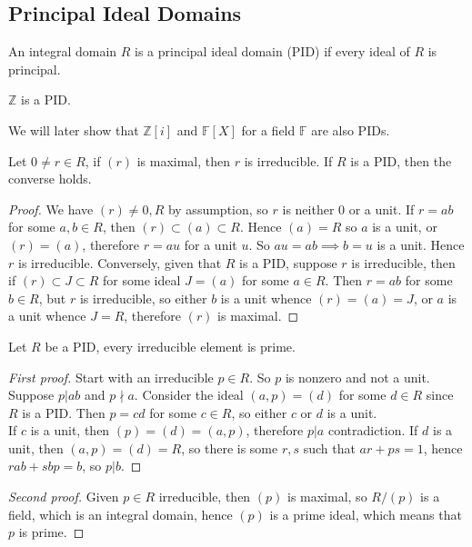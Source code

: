 \subsection{Principal Ideal Domains}
\begin{definition}
    An integral domain $R$ is a principal ideal domain (PID) if every ideal of $R$ is principal.
\end{definition}
\begin{example}
    $\mathbb Z$ is a PID.
\end{example}
We will later show that $\mathbb Z[i]$ and $\mathbb F[X]$ for a field $\mathbb F$ are also PIDs.
\begin{lemma}
    Let $0\neq r\in R$, if $(r)$ is maximal, then $r$ is irreducible.
    If $R$ is a PID, then the converse holds.
\end{lemma}
\begin{proof}
    We have $(r)\neq 0,R$ by assumption, so $r$ is neither $0$ or a unit.
    If $r=ab$ for some $a,b\in R$, then $(r)\subset (a)\subset R$.
    Hence $(a)=R$ so $a$ is a unit, or $(r)=(a)$, therefore $r=au$ for a unit $u$.
    So $au=ab\implies b=u$ is a unit.
    Hence $r$ is irreducible.
    Conversely, given that $R$ is a PID, suppose $r$ is irreducible, then if $(r)\subset J\subset R$ for some ideal $J=(a)$ for some $a\in R$.
    Then $r=ab$ for some $b\in R$, but $r$ is irreducible, so either $b$ is a unit whence $(r)=(a)=J$, or $a$ is a unit whence $J=R$, therefore $(r)$ is maximal.
\end{proof}
\begin{proposition}
    Let $R$ be a PID, every irreducible element is prime.
\end{proposition}
\begin{proof}[First proof]
    Start with an irreducible $p\in R$.
    So $p$ is nonzero and not a unit.
    Suppose $p|ab$ and $p\nmid a$.
    Consider the ideal $(a,p)=(d)$ for some $d\in R$ since $R$ is a PID.
    Then $p=cd$ for some $c\in R$, so either $c$ or $d$ is a unit.\\
    If $c$ is a unit, then $(p)=(d)=(a,p)$, therefore $p|a$ contradiction.
    If $d$ is a unit, then $(a,p)=(d)=R$, so there is some $r,s$ such that $ar+ps=1$, hence $rab+sbp=b$, so $p|b$.
\end{proof}
\begin{proof}[Second proof]
    Given $p\in R$ irreducible, then $(p)$ is maximal, so $R/(p)$ is a field, which is an integral domain, hence $(p)$ is a prime ideal, which means that $p$ is prime.
\end{proof}
